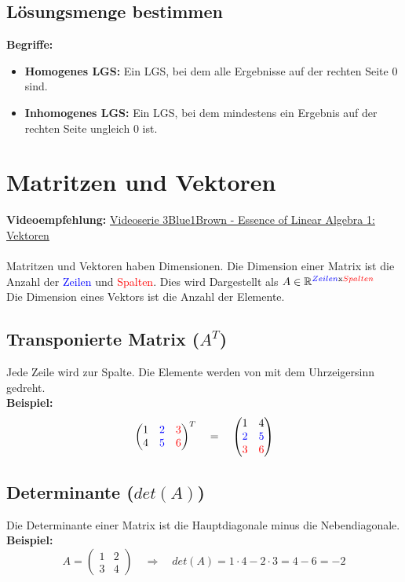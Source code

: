 \documentclass[12pt,a4paper]{article}
\begin{document}
\subsection{Lösungsmenge bestimmen}
\textbf{Begriffe:}
\begin{itemize}
    \item \textbf{Homogenes LGS:} Ein LGS, bei dem alle Ergebnisse auf der rechten Seite 0 sind.
    \item \textbf{Inhomogenes LGS:} Ein LGS, bei dem mindestens ein Ergebnis auf der rechten Seite ungleich 0 ist.
\end{itemize}
\section{Matritzen und Vektoren}
\textbf{Videoempfehlung:} \href{https://www.youtube.com/watch?v=fNk_zzaMoSs}{Videoserie 3Blue1Brown - Essence of Linear Algebra 1: Vektoren} \\ \\
Matritzen und Vektoren haben Dimensionen. Die Dimension einer Matrix ist die Anzahl der \textcolor{blue}{Zeilen} und \textcolor{red}{Spalten}. Dies wird Dargestellt als $A \in \mathbb{R}^{\textcolor{blue}{Zeilen}\text{x}\textcolor{red}{Spalten}}$\\ Die Dimension eines Vektors ist die Anzahl der Elemente. \\
\subsection{Transponierte Matrix (\texorpdfstring{$A^T$}{A^T})}
Jede Zeile wird zur Spalte. Die Elemente werden von mit dem Uhrzeigersinn gedreht. \\
\textbf{Beispiel:}
\[
\begin{pmatrix}
1 & \textcolor{blue}{2} & \textcolor{red}{3} \\
4 & \textcolor{blue}{5} & \textcolor{red}{6}
\end{pmatrix}^T
\quad
=
\quad
\begin{pmatrix}
    1 & 4 \\
    \textcolor{blue}{2} & \textcolor{blue}{5} \\
    \textcolor{red}{3} & \textcolor{red}{6}
\end{pmatrix}
\]

\subsection{Determinante (\texorpdfstring{$det(A)$}{det(A)})}
Die Determinante einer Matrix ist die Hauptdiagonale minus die Nebendiagonale. \\
\textbf{Beispiel:}
\[
A = 
\begin{pmatrix}
1 & 2 \\
3 & 4
\end{pmatrix}
\quad
\Rightarrow
\quad
det(A) = 1 \cdot 4 - 2 \cdot 3 = 4 - 6 = -2
\]
\end{document}
